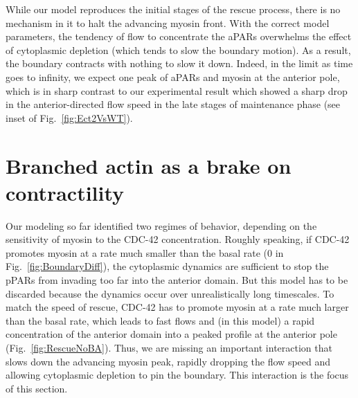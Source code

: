 \documentclass[11pt]{article}
\newcommand{\6}[1]{#1_{\text{6}}}
\newcommand{\3}[1]{#1_{\text{3}}}
\begin{document}
While our model reproduces the initial stages of the rescue process, there is no mechanism in it to halt the advancing myosin front. With the correct model parameters, the tendency of flow to concentrate the aPARs overwhelms the effect of cytoplasmic depletion (which tends to slow the boundary motion). As a result, the boundary contracts with nothing to slow it down. Indeed, in the limit as time goes to infinity, we expect one peak of aPARs and myosin at the anterior pole, which is in sharp contrast to our experimental result which showed a sharp drop in the anterior-directed flow speed in the late stages of maintenance phase (see inset of Fig.\ \ref{fig:Ect2VsWT}).

\section{Branched actin as a brake on contractility }


Our modeling so far identified two regimes of behavior, depending on the sensitivity of myosin to the CDC-42 concentration. Roughly speaking, if CDC-42 promotes myosin at a rate much smaller than the basal rate (0 in Fig.\ \ref{fig:BoundaryDiff}), the cytoplasmic dynamics are sufficient to stop the pPARs from invading too far into the anterior domain. But this model has to be discarded because the dynamics occur over unrealistically long timescales. To match the speed of rescue, CDC-42 has to promote myosin at a rate much larger than the basal rate, which leads to fast flows and (in this model) a rapid concentration of the anterior domain into a peaked profile at the anterior pole (Fig.\ \ref{fig:RescueNoBA}). Thus, we are missing an important interaction that slows down the advancing myosin peak, rapidly dropping the flow speed and allowing cytoplasmic depletion to pin the boundary. This interaction is the focus of this section.
\end{document}
